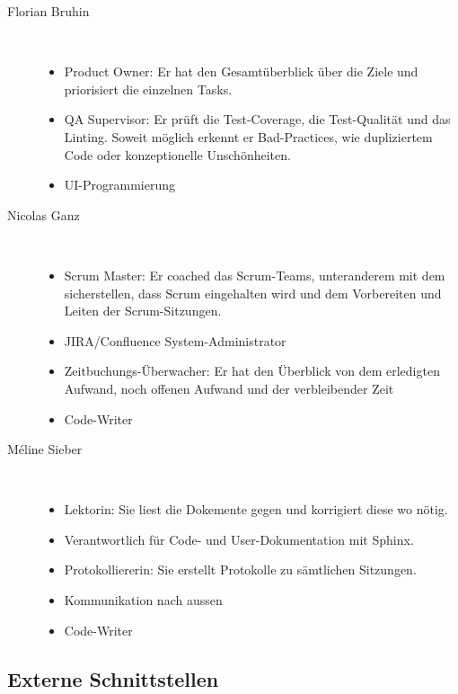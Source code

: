 \documentclass[a4paper]{article}
\begin{document}
\begin{description}

\item[Florian Bruhin] \strut \\[-1em]
  \begin{itemize}
    \item Product Owner: Er hat den Gesamtüberblick über die Ziele und priorisiert die einzelnen Tasks.
    \item QA Supervisor: Er prüft die Test-Coverage, die Test-Qualität und das Linting. Soweit möglich erkennt er Bad-Practices, wie dupliziertem Code oder konzeptionelle Unschönheiten.
    \item UI-Programmierung
  \end{itemize}
\item[Nicolas Ganz] \strut \\[-1em]
  \begin{itemize}
    \item Scrum Master: Er coached das Scrum-Teams, unteranderem mit dem sicherstellen, dass Scrum eingehalten wird und dem Vorbereiten und Leiten der Scrum-Sitzungen.
    \item JIRA/Confluence System-Administrator
    \item Zeitbuchungs-Überwacher: Er hat den Überblick von dem erledigten Aufwand, noch offenen Aufwand und der verbleibender Zeit
    \item Code-Writer
  \end{itemize}
\item[Méline Sieber] \strut \\[-1em]
  \begin{itemize}
    \item Lektorin: Sie liest die Dokemente gegen und korrigiert diese wo nötig.
    \item Verantwortlich für Code- und User-Dokumentation mit Sphinx.
    \item Protokolliererin: Sie erstellt Protokolle zu sämtlichen Sitzungen.
    \item Kommunikation nach aussen
    \item Code-Writer
  \end{itemize}
\end{description}

\subsection{Externe Schnittstellen}
\end{document}
